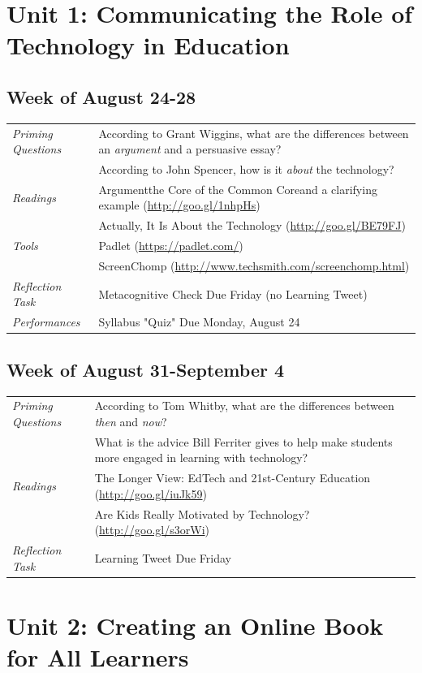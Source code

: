 \documentclass{tufte-handout}
\newcommand{\tabpq}{\faQuestionCircle\medspace\textit{Priming Questions}}
\newcommand{\tabread}{\faBook\medspace\textit{Readings}}
\newcommand{\tabperformance}{\faTasks\medspace\textit{Performances}}
\newcommand{\tabtools}{\faWrench\medspace\textit{Tools}}
\newcommand{\tabtweet}{\faLightbulbO\medspace\textit{Reflection Task} & Learning Tweet Due Friday \\}
\newcommand{\tabcheck}{\faLightbulbO\medspace\textit{Reflection Task} & Metacognitive Check Due Friday (no Learning Tweet) \\}
\newenvironment{tabsched}
	{\small
	\begin{tabular}{p{1.5in}p{4.5in}}
	\toprule}
	{\bottomrule
	\end{tabular}
	\normalsize}
\newcommand{\weektwo}{August 24-28}
\newcommand{\weekthree}{August 31-September 4}
\begin{document}
\section{Unit 1: Communicating the Role of Technology in Education}

\subsection{Week of \weektwo}

\begin{tabsched}
	\tabpq & According to Grant Wiggins, what are the differences between an \emph{argument} and a persuasive essay? \\
	& According to John Spencer, how is it \emph{about} the technology? \\
	\midrule
	\tabread & Argument\textemdash{}the Core of the Common Core\textemdash{}and a clarifying example (\url{http://goo.gl/1nhpHs}) \\
	& Actually, It Is About the Technology (\url{http://goo.gl/BE79FJ}) \\
	\midrule
	\tabtools & Padlet (\url{https://padlet.com/}) \\
	& ScreenChomp (\url{http://www.techsmith.com/screenchomp.html}) \\
	\midrule
	\tabcheck
	\midrule
	\tabperformance & Syllabus "Quiz" Due Monday, August 24 \\
\end{tabsched}

\subsection{Week of \weekthree}

\begin{tabsched}
	\tabpq & According to Tom Whitby, what are the differences between \textit{then} and \textit{now}? \\
	& What is the advice Bill Ferriter gives to help make students more engaged in learning with technology? \\
	\midrule
	\tabread & The Longer View: EdTech and 21st-Century Education (\url{http://goo.gl/iuJk59}) \\
	& Are Kids Really Motivated by Technology? (\url{http://goo.gl/s3orWi}) \\
	\midrule
	\tabtweet
\end{tabsched}

\section{Unit 2: Creating an Online Book for All Learners}
\end{document}
